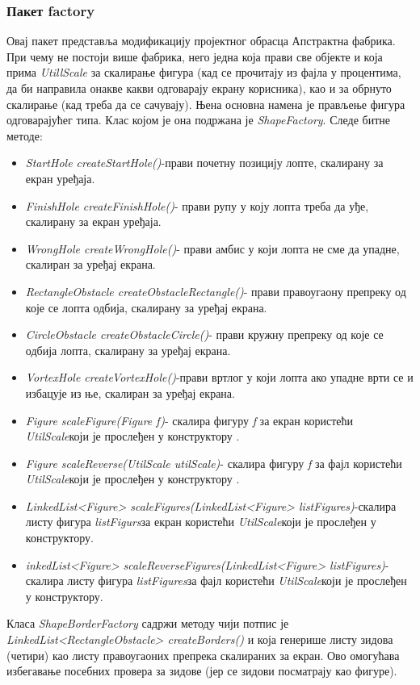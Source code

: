 \subsubsection{Пакет factory}
Овај пакет представља модификацију пројектног обрасца Апстрактна фабрика. При чему не постоји више фабрика, него једна која прави све објекте и која прима \emph{UtillScale} за скалирање фигура (кад се прочитају из фајла у процентима, да би направила онакве какви одговарају екрану корисника), као и за обрнуто скалирање (кад треба да се сачувају). Њена основна намена је прављење фигура одговарајућег типа. Клас којом је она подржана је \emph{ShapeFactory}. Следе битне методе:
\begin{itemize}
\item \emph{StartHole createStartHole()}-прави почетну позицију лопте, скалирану за екран уређаја.
\item \emph{FinishHole createFinishHole()}- прави рупу у коју лопта треба да уђе, скалирану за екран уређаја.
\item \emph{WrongHole createWrongHole()}- прави амбис у који лопта не сме да упадне, скалиран за уређај екрана.
\item \emph{RectangleObstacle createObstacleRectangle()}- прави правоугаону препреку од које се лопта одбија, скалирану за уређај екрана.
\item \emph{CircleObstacle createObstacleCircle()}- прави кружну препреку од које се одбија лопта, скалирану за уређај екрана.
\item \emph{VortexHole createVortexHole()}-прави вртлог у који лопта ако упадне врти се и избацује из ње, скалиран за уређај екрана.
\item \emph{Figure scaleFigure(Figure f)}- скалира фигуру \emph{f} за екран користећи \emph{UtilScale}који је прослеђен у конструктору .
\item \emph{Figure scaleReverse(UtilScale utilScale)}- скалира фигуру \emph{f} за фајл користећи \emph{UtilScale}који је прослеђен у конструктору .
\item \emph{LinkedList<Figure> scaleFigures(LinkedList<Figure> listFigures)}-скалира листу фигура \emph{listFigurs}за екран користећи \emph{UtilScale}који је прослеђен у конструктору.
\item \emph{inkedList<Figure> scaleReverseFigures(LinkedList<Figure> listFigures)}-скалира листу фигура \emph{listFigures}за фајл користећи \emph{UtilScale}који је прослеђен у конструктору.
\end{itemize}
Класа \emph{ShapeBorderFactory} садржи методу чији потпис је \\\emph{LinkedList<RectangleObstacle> createBorders()} и која генерише листу зидова (четири) као листу правоугаоних препрека скалираних за екран. Ово омогућава избегавање посебних провера за зидове (јер се зидови посматрају као фигуре).

